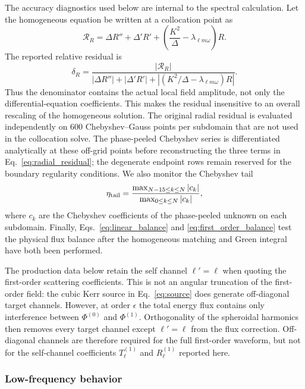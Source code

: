 \documentclass[aps,prd,twocolumn,10pt,nofootinbib,superscriptaddress,floatfix]{revtex4-2}
\newcommand{\DeltaK}{\Delta}
\newcommand{\Res}{\mathcal R}
\begin{document}
The accuracy diagnostics used below are internal to the spectral calculation.
Let the homogeneous equation be written at a collocation point as
\begin{equation}
\Res_R=\DeltaK R''+\DeltaK'R'
+\left(\frac{K^2}{\DeltaK}-\lambda_{\ell m\omega}\right)R .
\end{equation}
The reported relative residual is
\begin{equation}
\delta_R=
\frac{|\Res_R|}
{|\DeltaK R''|+|\DeltaK'R'|
+\left|\left(K^2/\DeltaK-\lambda_{\ell m\omega}\right)R\right|}.
\label{eq:radial_residual}
\end{equation}
Thus the denominator contains the actual local field amplitude, not only the
differential-equation coefficients.  This makes the residual insensitive to an
overall rescaling of the homogeneous solution.  The original radial residual
is evaluated independently on 600 Chebyshev--Gauss points per subdomain that
are not used in the collocation solve.  The phase-peeled Chebyshev series is
differentiated analytically at these off-grid points before reconstructing the
three terms in Eq.~\eqref{eq:radial_residual}; the degenerate endpoint rows
remain reserved for the boundary regularity conditions.  We also monitor the Chebyshev
tail
\begin{equation}
\eta_{\rm tail}=
\frac{\max_{N-15\le k\le N}|c_k|}
{\max_{0\le k\le N}|c_k|},
\end{equation}
where $c_k$ are the Chebyshev coefficients of the phase-peeled unknown on each
subdomain.  Finally, Eqs.~\eqref{eq:linear_balance} and
\eqref{eq:first_order_balance} test the physical flux balance after the
homogeneous matching and Green integral have both been performed.

The production data below retain the self channel $\ell'=\ell$ when quoting
the first-order scattering coefficients.  This is not an angular truncation of
the first-order field: the cubic Kerr source in Eq.~\eqref{eq:source} does
generate off-diagonal target channels.  However, at order $\epsilon$ the total
energy flux contains only interference between $\Phi^{(0)}$ and
$\Phi^{(1)}$.  Orthogonality of the spheroidal harmonics then removes every
target channel except $\ell'=\ell$ from the flux correction.  Off-diagonal
channels are therefore required for the full first-order waveform, but not for
the self-channel coefficients $T_\ell^{(1)}$ and $R_\ell^{(1)}$ reported here.

\subsubsection{Low-frequency behavior}
\end{document}
